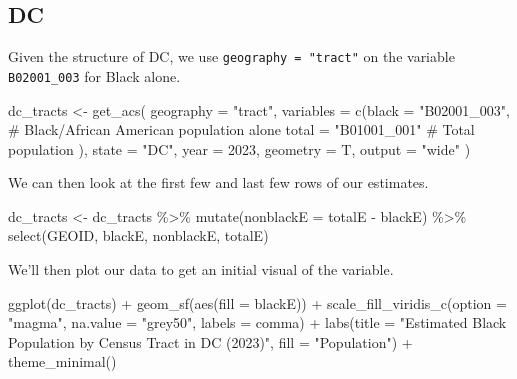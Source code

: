 \documentclass[
  letterpaper,
  DIV=11,
  numbers=noendperiod]{scrartcl}
\newenvironment{Shaded}{\begin{snugshade}}{\end{snugshade}}
\newcommand{\AttributeTok}[1]{\textcolor[rgb]{0.40,0.45,0.13}{#1}}
\newcommand{\CommentTok}[1]{\textcolor[rgb]{0.37,0.37,0.37}{#1}}
\newcommand{\DecValTok}[1]{\textcolor[rgb]{0.68,0.00,0.00}{#1}}
\newcommand{\FunctionTok}[1]{\textcolor[rgb]{0.28,0.35,0.67}{#1}}
\newcommand{\NormalTok}[1]{\textcolor[rgb]{0.00,0.23,0.31}{#1}}
\newcommand{\OtherTok}[1]{\textcolor[rgb]{0.00,0.23,0.31}{#1}}
\newcommand{\SpecialCharTok}[1]{\textcolor[rgb]{0.37,0.37,0.37}{#1}}
\newcommand{\StringTok}[1]{\textcolor[rgb]{0.13,0.47,0.30}{#1}}
\begin{document}
\subsection{DC}\label{dc}

Given the structure of DC, we use \texttt{geography\ =\ "tract"} on the
variable \texttt{B02001\_003} for Black alone.

\begin{Shaded}
\begin{Highlighting}[]
\NormalTok{dc\_tracts }\OtherTok{\textless{}{-}} \FunctionTok{get\_acs}\NormalTok{(}
  \AttributeTok{geography =} \StringTok{"tract"}\NormalTok{,}
  \AttributeTok{variables =} \FunctionTok{c}\NormalTok{(}\AttributeTok{black =} \StringTok{"B02001\_003"}\NormalTok{, }\CommentTok{\# Black/African American population alone}
                \AttributeTok{total =} \StringTok{"B01001\_001"} \CommentTok{\# Total population}
\NormalTok{  ),}
  \AttributeTok{state =} \StringTok{"DC"}\NormalTok{,}
  \AttributeTok{year =} \DecValTok{2023}\NormalTok{,}
  \AttributeTok{geometry =}\NormalTok{ T,}
  \AttributeTok{output =} \StringTok{"wide"}
\NormalTok{)}
\end{Highlighting}
\end{Shaded}

We can then look at the first few and last few rows of our estimates.

\begin{Shaded}
\begin{Highlighting}[]
\NormalTok{dc\_tracts }\OtherTok{\textless{}{-}}\NormalTok{ dc\_tracts }\SpecialCharTok{\%\textgreater{}\%} 
  \FunctionTok{mutate}\NormalTok{(}\AttributeTok{nonblackE =}\NormalTok{ totalE }\SpecialCharTok{{-}}\NormalTok{ blackE) }\SpecialCharTok{\%\textgreater{}\%} 
  \FunctionTok{select}\NormalTok{(GEOID, blackE, nonblackE, totalE)}
\end{Highlighting}
\end{Shaded}

We'll then plot our data to get an initial visual of the variable.

\begin{Shaded}
\begin{Highlighting}[]
\FunctionTok{ggplot}\NormalTok{(dc\_tracts) }\SpecialCharTok{+}
  \FunctionTok{geom\_sf}\NormalTok{(}\FunctionTok{aes}\NormalTok{(}\AttributeTok{fill =}\NormalTok{ blackE)) }\SpecialCharTok{+}
  \FunctionTok{scale\_fill\_viridis\_c}\NormalTok{(}\AttributeTok{option =} \StringTok{"magma"}\NormalTok{, }
                       \AttributeTok{na.value =} \StringTok{"grey50"}\NormalTok{,}
                       \AttributeTok{labels =}\NormalTok{ comma) }\SpecialCharTok{+}
  \FunctionTok{labs}\NormalTok{(}\AttributeTok{title =} \StringTok{"Estimated Black Population by Census Tract in DC (2023)"}\NormalTok{,}
       \AttributeTok{fill =} \StringTok{"Population"}\NormalTok{) }\SpecialCharTok{+}
  \FunctionTok{theme\_minimal}\NormalTok{()}
\end{Highlighting}
\end{Shaded}
\end{document}
